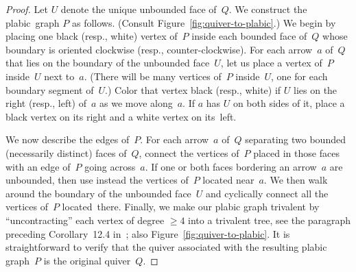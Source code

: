 \begin{proof}
Let $U$ denote the unique unbounded face of~$Q$. 
We construct the plabic~graph $P$ as follows. 
(Consult Figure~\ref{fig:quiver-to-plabic}.) 
We begin by placing one black (resp., white) vertex of~$P$ inside each bounded face of~$Q$ 
whose boundary is oriented clockwise (resp., counter-clockwise). 
For each arrow~$a$ of~$Q$ that lies on the boundary of the unbounded face~$U$,
let us place a vertex of~$P$ inside~$U$ next to~$a$. 
(There will be many vertices of~$P$ inside~$U$, one for each boundary segment of~$U$.) 
Color that vertex black (resp., white) if $U$ lies on the right (resp., left) of~$a$ as we move along~$a$. 
If $a$ has $U$ on both sides of it, place a black vertex on its right and a white vertex on its~left. 

We now describe the edges of~$P$. 
For each arrow~$a$ of~$Q$ separating two bounded (necessarily distinct) faces of~$Q$, 
connect the vertices of~$P$ placed in those faces with an edge of~$P$ going across~$a$.
If one or both faces bordering an arrow~$a$ are unbounded, then use instead 
the vertices of~$P$ located near~$a$. 
We then walk around the boundary of the unbounded face~$U$ 
and cyclically connect all the vertices of~$P$ located~there. 
%
Finally, we make our plabic graph trivalent by ``uncontracting'' each vertex of degree $\ge 4$ into a trivalent tree, 
see the paragraph preceding Corollary~12.4 in~\cite{postnikov}; \cf also Figure~\ref{fig:quiver-to-plabic}.
%
It is straightforward to verify that the quiver associated with the resulting plabic graph~$P$
is the original quiver~$Q$. 
\end{proof}

